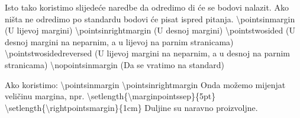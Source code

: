 \documentclass[addpoints,answers]{beamer}
\newcounter{points}
\begin{document}
\begin{frame}
Isto tako koristimo slijedeće naredbe da odredimo di će se bodovi nalazit. Ako ništa ne odredimo po standardu bodovi će pisat ispred pitanja.
\newline
\newline
\color{blue}
\textbackslash{pointsinmargin}
\color{black}
(U lijevoj margini)
\color{blue}
\newline
\newline
\textbackslash{pointsinrightmargin}
\color{black}
(U desnoj margini)
\color{blue}
\newline
\newline
\textbackslash{pointstwosided}
\color{black}
(U desnoj margini na neparnim, a u lijevoj na parnim stranicama)
\color{blue}
\newline
\newline
\textbackslash{pointstwosidedreversed}
\color{black}
(U lijevoj margini na neparnim, a u desnoj na parnim stranicama)
\color{blue}
\newline
\newline
\textbackslash{nopointsinmargin}\color{black}   (Da se vratimo na standard)
\end{frame}

\begin{frame}
Ako koristimo:
\newline
\newline
\color{blue}
\textbackslash{pointsinmargin}
\newline
\newline
\textbackslash{pointsinrightmargin}
\newline
\newline
\color{black}
Onda možemo mijenjat veličinu margina, npr.
\newline
\newline
\color{blue}
\textbackslash{setlength\{\textbackslash{marginpointssep}\}}\{5pt\}
\newline
\newline
\textbackslash{setlength\{\textbackslash{rightpointsmargin}\}}\{1cm\}
\color{black}
\newline
\newline
Duljine su naravno proizvoljne.
\end{frame}
\end{document}

